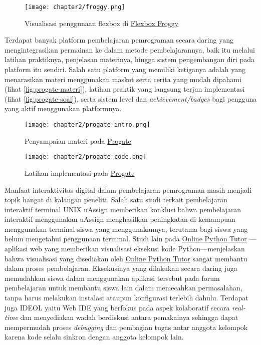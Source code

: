 \begin{figure}[H]
  \centering
  \texttt{[image: chapter2/froggy.png]}
  \caption{Visualisasi penggunaan flexbox di \href{https://www.flexboxfroggy.com/}{Flexbox Froggy}}\label{fig:froggy}
\end{figure}

Terdapat banyak platform pembelajaran pemrograman secara daring yang mengintegrasikan permainan ke dalam metode pembelajarannya, baik itu melalui latihan praktiknya, penjelasan materinya, hingga sistem pengembangan diri pada platform itu sendiri. Salah satu platform yang memiliki ketiganya adalah \textcite{progate2021media} yang menarasikan materi menggunakan maskot serta cerita yang mudah dipahami (lihat \autoref{fig:progate-materi}), latihan praktik yang langsung terjun implementasi (lihat \autoref{fig:progate-soal}), serta sistem level dan \textit{achievement/badges} bagi pengguna yang aktif menggunakan platformnya.

\begin{figure}[H]
  \centering
  \texttt{[image: chapter2/progate-intro.png]}
  \caption{Penyampaian materi pada \href{https://www.progate.com/}{Progate}}\label{fig:progate-materi}
\end{figure}

\begin{figure}[H]
  \centering
  \texttt{[image: chapter2/progate-code.png]}
  \caption{Latihan implementasi pada \href{https://www.progate.com/}{Progate}}\label{fig:progate-soal}
\end{figure}

Manfaat interaktivitas digital dalam pembelajaran pemrograman masih menjadi topik hangat di kalangan peneliti. Salah satu studi terkait pembelajaran interaktif terminal UNIX uAssign \parencite{bailey2019uassign} memberikan konklusi bahwa pembelajaran interaktif menggunakan uAssign menghasilkan peningkatan di kemampuan menggunakan terminal siswa yang menggunakannya, terutama bagi siswa yang belum mengetahui  penggunaan terminal. Studi lain pada \href{https://pythontutor.com}{Online Python Tutor} \parencite{guo2013pythontutor}---aplikasi web yang memberikan visualisasi eksekusi kode Python---menjelaskan bahwa visualisasi yang disediakan oleh \href{https://pythontutor.com}{Online Python Tutor} sangat membantu dalam proses pembelajaran. Eksekusinya yang dilakukan secara daring juga memudahkan siswa dalam menggunakan aplikasi tersebut pada forum pembelajaran untuk membantu siswa lain dalam memecahkan permasalahan, tanpa harus melakukan instalasi ataupun konfigurasi terlebih dahulu. Terdapat juga IDEOL \parencite{tran2013interactive} yaitu Web IDE yang berfokus pada aspek kolaboratif secara \textit{real-time} dan menyediakan wadah berdiskusi antara pemakainya sehingga dapat mempermudah proses \textit{debugging} dan pembagian tugas antar anggota kelompok karena kode selalu sinkron dengan anggota kelompok lain.

